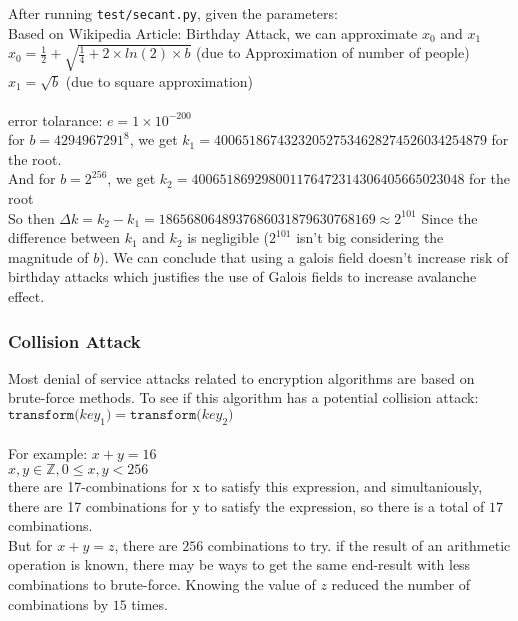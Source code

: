\documentclass[fleqn, a4paper,12pt]{article}
\begin{document}
After running \texttt{test/secant.py}, given the parameters: \\
Based on Wikipedia Article: Birthday Attack, we can approximate $x_0$ and $x_1$ \\
$x_0 = \frac{1}{2}+\sqrt{\frac{1}{4}+2 \times ln(2) \times b}$ (due to Approximation of number of people) \\
$x_1 = \sqrt{b}$ (due to square approximation) \\
\\ error tolarance:
$e = 1 \times 10^{-200}$ \\
for $b=4294967291^8$,  we get $k_1 = 400651867432320527534628274526034254879$ for the root. \\
And for $b = 2^{256}$, we get $k_2 = 400651869298001176472314306405665023048$ for the root \\
So then $\Delta k = k_2 - k_1 = 1865680648937686031879630768169 \approx 2^{101}$
Since the difference between $k_1$ and $k_2$ is negligible ($2^{101}$ isn't big considering the magnitude of $b$). We can conclude  that using a galois field doesn't increase risk of birthday attacks which justifies the use of Galois fields to increase avalanche effect.

\subsubsection {Collision Attack} \label{collision_attack}

Most denial of service attacks related to encryption algorithms are based on brute-force methods. To see if this algorithm has a potential collision attack: \\
$\texttt{transform(} key_1 \texttt{)} = \texttt{transform(} key_2 \texttt{)}$ \\
\\
For example: $x + y = 16$ \\

$ x,y \in \mathbb{Z}, 0 \leq x,y < 256$ \\
there are 17-combinations for x to satisfy this expression, and simultaniously, there are 17 combinations for y to satisfy the expression, so there is a total of $17$ combinations.
\\
But for $x + y = z$, there are $256$ combinations to try. if the result of an arithmetic operation is known, there may be ways to get the same end-result with less combinations to brute-force. Knowing the value of $z$ reduced the number of combinations by $15$ times.
\end{document}
